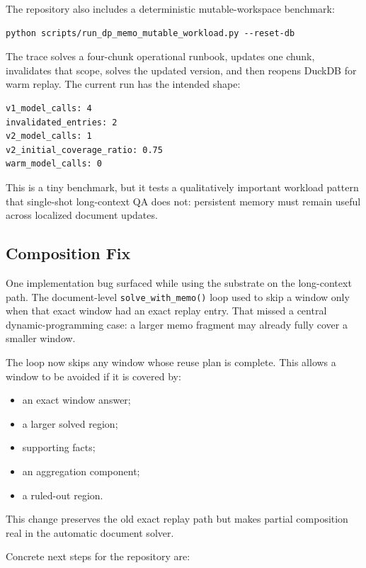 \documentclass[11pt]{article}
\begin{document}
The repository also includes a deterministic mutable-workspace benchmark:

\begin{verbatim}
python scripts/run_dp_memo_mutable_workload.py --reset-db
\end{verbatim}

The trace solves a four-chunk operational runbook, updates one chunk,
invalidates that scope, solves the updated version, and then reopens DuckDB for
warm replay. The current run has the intended shape:

\begin{verbatim}
v1_model_calls: 4
invalidated_entries: 2
v2_model_calls: 1
v2_initial_coverage_ratio: 0.75
warm_model_calls: 0
\end{verbatim}

This is a tiny benchmark, but it tests a qualitatively important workload
pattern that single-shot long-context QA does not: persistent memory must remain
useful across localized document updates.

\subsection{Composition Fix}

One implementation bug surfaced while using the substrate on the long-context
path. The document-level \texttt{solve\_with\_memo()} loop used to skip a
window only when that exact window had an exact replay entry. That missed a
central dynamic-programming case: a larger memo fragment may already fully
cover a smaller window.

The loop now skips any window whose reuse plan is complete. This allows a
window to be avoided if it is covered by:

\begin{itemize}[leftmargin=*]
    \item an exact window answer;
    \item a larger solved region;
    \item supporting facts;
    \item an aggregation component;
    \item a ruled-out region.
\end{itemize}

This change preserves the old exact replay path but makes partial composition
real in the automatic document solver.

Concrete next steps for the repository are:
\end{document}
